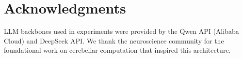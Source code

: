 \documentclass[11pt,a4paper]{article}
\begin{document}
\section*{Acknowledgments}

LLM backbones used in experiments were provided by the Qwen API (Alibaba Cloud) and DeepSeek API.
We thank the neuroscience community for the foundational work on cerebellar computation that inspired this architecture.


\end{document}
